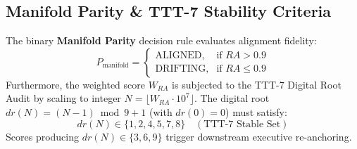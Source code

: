 \subsection{Manifold Parity & TTT-7 Stability Criteria}
The binary \textbf{Manifold Parity} decision rule evaluates alignment fidelity:
\begin{equation}
    P_{\text{manifold}} = \begin{cases}
        \text{ALIGNED}, & \text{if } RA > 0.9 \\
        \text{DRIFTING}, & \text{if } RA \le 0.9
    \end{cases}
\end{equation}
Furthermore, the weighted score $W_{RA}$ is subjected to the TTT-7 Digital Root Audit by scaling to integer $N = \lfloor W_{RA} \cdot 10^7 \rfloor$. The digital root $dr(N) = (N - 1) \bmod 9 + 1$ (with $dr(0)=0$) must satisfy:
\begin{equation}
    dr(N) \in \{1, 2, 4, 5, 7, 8\} \quad (\text{TTT-7 Stable Set})
\end{equation}
Scores producing $dr(N) \in \{3, 6, 9\}$ trigger downstream executive re-anchoring.
